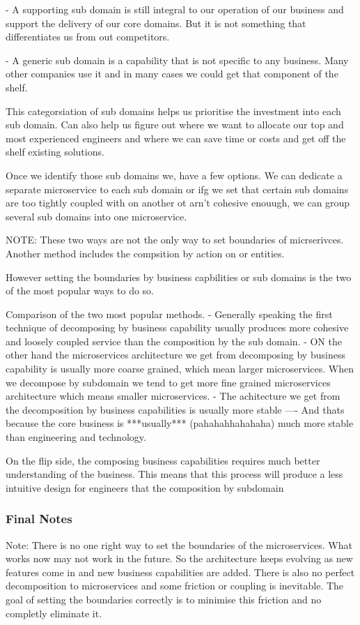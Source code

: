 \documentclass[a4paper, 11pt]{book}
\begin{document}
{    - A supporting sub domain is still integral to our operation of our business and support the delivery of our core domains.
    But it is not something that differentiates us from out competitors.

    - A generic sub domain is a capability that is not specific to any business.
    Many other companies use it and in many cases we could get that component of the shelf.

    This categorsiation of sub domains helps us prioritise the investment into each sub domain.
    Can also help us figure out where we want to allocate our top and most experienced engineers and where we can save time or costs and get off the shelf existing solutions.

    Once we identify those sub domains we, have a few options.
    We can dedicate a separate microservice to each sub domain or ifg we set that certain sub domains are too tightly coupled with on another ot arn't cohesive enouugh, we can group several sub domains into one microservice.

    NOTE: These two ways are not the only way to set boundaries of micrserivces.
    Another method includes the compsition by action on or entities.

    However setting the boundaries by business capbilities or sub domains is the two of the most popular ways to do so.

    Comparison of the two most popular methods.
    - Generally speaking the first technique of decomposing by business capability usually produces more cohesive and loosely coupled service than the composition by the sub domain.
    - ON the other hand the microservices architecture we get from decomposing by business capability is usually more coarse grained, which mean larger microservices.
    When we decompose by subdomain we tend to get more fine grained microservices architecture which means smaller microservices.
    - The achitecture we get from the decomposition by business capabilities is usually more stable
    ---- And thats because the core business is ***usually*** (pahahahhahahaha) much more stable than engineering and technology.

    On the flip side, the composing business capabilities requires much better understanding of the business.
    This means that this process will produce a less intuitive design for engineers that the composition by subdomain

    \subsubsection{Final Notes}
    Note: There is no one right way to set the boundaries of the microservices. What works now may not work in the future.
    So the architecture keeps evolving as new features come in and new business capabilities are added.
    There is also no perfect decomposition to microservices and some friction or coupling is inevitable.
    The goal of setting the boundaries correctly is to minimise this friction and no completly eliminate it.

}
\end{document}
